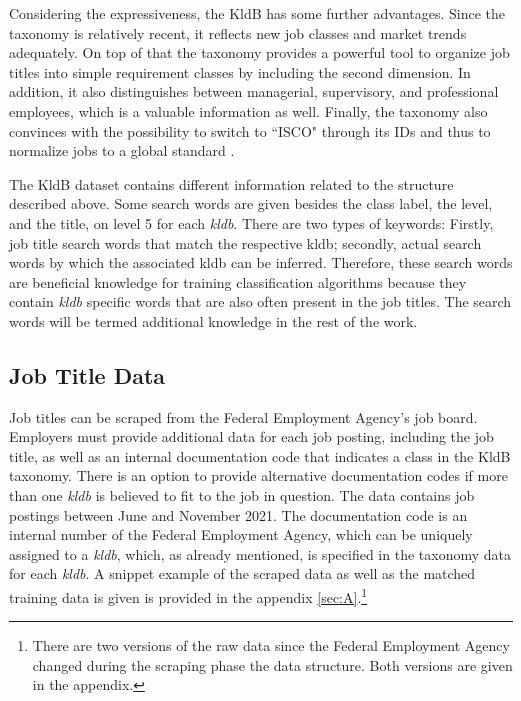 \documentclass[12pt, a4paper, titlepage]{article}
\begin{document}
Considering the expressiveness, the \ac{KldB} has some further advantages. Since the taxonomy is relatively recent, it reflects new job classes and market trends adequately. On top of that the taxonomy provides a powerful tool to organize job titles into simple requirement classes by including the second dimension. In addition, it also distinguishes between managerial, supervisory, and professional employees, which is a valuable information as well. Finally, the taxonomy also convinces with the possibility to switch to ``\ac{ISCO}" through its IDs and thus to normalize jobs to a global standard \citep{Bundesagentur2011b}. 
  
The \ac{KldB} dataset contains different information related to the structure described above. Some search words are given besides the class label, the level, and the title, on level 5 for each \textit{kldb}. 
There are two types of keywords: Firstly, job title search words that match the respective kldb; secondly, actual search words by which the associated kldb can be inferred. Therefore, these search words are beneficial knowledge for training classification algorithms because they contain \textit{kldb} specific words that are also often present in the job titles. The search words will be termed additional knowledge in the rest of the work. 

 
\subsection{Job Title Data}
Job titles can be scraped from the Federal Employment Agency's job board. Employers must provide additional data for each job posting, including the job title, as well as an internal documentation code that indicates a class in the \ac{KldB} taxonomy. There is an option to provide alternative documentation codes if more than one \textit{kldb} is believed to fit to the job in question. The data contains job postings between June and November 2021. The documentation code is an internal number of the Federal Employment Agency, which can be uniquely assigned to a \textit{kldb}, which, as already mentioned, is specified in the taxonomy data for each \textit{kldb}. A snippet example of the scraped data as well as the matched training data is given is provided in the appendix \ref{sec:A}.\footnote{There are two versions of the raw data since the Federal Employment Agency changed during the scraping phase the data structure. Both versions are given in the appendix.}
\end{document}
